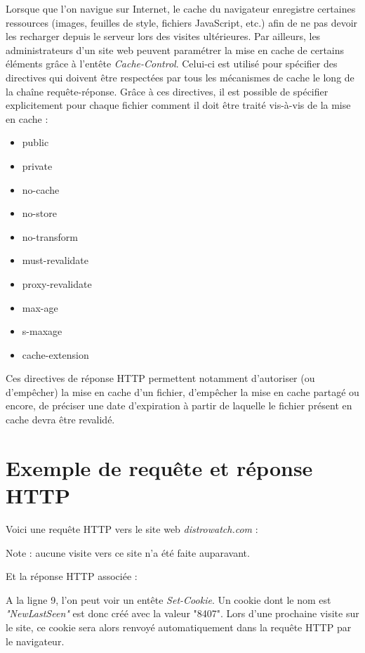 Lorsque que l'on navigue sur Internet, le cache du navigateur enregistre certaines ressources (images, feuilles de style, fichiers JavaScript, etc.) afin de ne pas devoir les recharger depuis le serveur lors des visites ultérieures. Par ailleurs, les administrateurs d'un site web peuvent paramétrer la mise en cache de certains éléments grâce à l'entête \textit{Cache-Control}. Celui-ci est utilisé pour spécifier des directives qui doivent être respectées par tous les mécanismes de cache le long de la chaîne requête-réponse. Grâce à ces directives, il est possible de spécifier explicitement pour chaque fichier comment il doit être traité vis-à-vis de la mise en cache \cite{IETF_RFC2616} :
\begin{multicols}{2}
\begin{itemize}
  \item public
  \item private
  \item no-cache
  \item no-store
  \item no-transform
  \item must-revalidate
  \item proxy-revalidate
  \item max-age
  \item s-maxage
  \item cache-extension
\end{itemize}
\end{multicols}

Ces directives de réponse HTTP permettent notamment d'autoriser (ou d'empêcher) la mise en cache d'un fichier, d'empêcher la mise en cache partagé ou encore, de préciser une date d'expiration à partir de laquelle le fichier présent en cache devra être revalidé.


\section{Exemple de requête et réponse HTTP}
\label{http_request_example}
Voici une requête HTTP vers le site web \textit{distrowatch.com} :

Note : aucune visite vers ce site n'a été faite auparavant.
\newline

Et la réponse HTTP associée :


A la ligne 9, l'on peut voir un entête \textit{Set-Cookie}. Un cookie dont le nom est \textit{"NewLastSeen"} est donc créé avec la valeur "8407". Lors d'une prochaine visite sur le site, ce cookie sera alors renvoyé automatiquement dans la requête HTTP par le navigateur.

